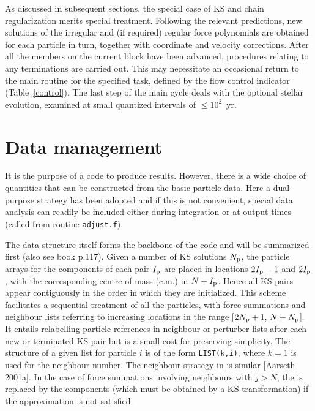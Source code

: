 \documentclass[12pt]{article}
\begin{document}
As discussed in subsequent sections, the special case of KS and chain
regularization merits special treatment.
Following the relevant predictions, new solutions of the irregular and
(if required) regular force polynomials are obtained for each particle
in turn, together with coordinate and velocity corrections.
After all the members on the current block have been advanced, procedures
relating to any terminations are carried out.
This may necessitate an occasional return to the main routine for the
specified task, defined by the flow control indicator
(\cf Table~\ref{control}).
The last step of the main cycle deals with the optional stellar evolution,
examined at small quantized intervals of $\le 10^2$~yr.

\section{Data management} \label{data}

It is the purpose of a code to produce results.
However, there is a wide choice of quantities that can be constructed from
the basic particle data.
Here a dual-purpose strategy has been adopted and if this is not convenient,
special data analysis can readily be included either during integration or
at output times (\ie called from routine {\tt adjust.f}).

The data structure itself forms the backbone of the code and will be
summarized first (also see book p.117).
Given a number of KS solutions $N_{\rm p}$, the particle arrays for the
components of each pair $I_{\rm p}$ are placed in locations $2 I_{\rm p}-1$
and $2 I_{\rm p}$, with the corresponding centre of mass (c.m.) in
$N + I_{\rm p}$.
Hence all KS pairs appear contiguously in the order in which they are
initialized.
This scheme facilitates a sequential treatment of all the particles, with
force summations and neighbour lists referring to increasing locations in
the range [$2 N_{\rm p}+1, \, N + N_{\rm p}$].
It entails relabelling particle references in neighbour or perturber lists
after each new or terminated KS pair but is a small cost for preserving
simplicity.
The structure of a given list for particle $i$ is of the form
{\tt LIST(k,i)}, where $k=1$ is used for the neighbour number.
The neighbour strategy in {} is similar [Aarseth 2001a].
In the case of force summations involving neighbours with $j > N$, the \cm is
replaced by the components (which must be obtained by a KS transformation) if
the \cm approximation is not satisfied.
\end{document}
